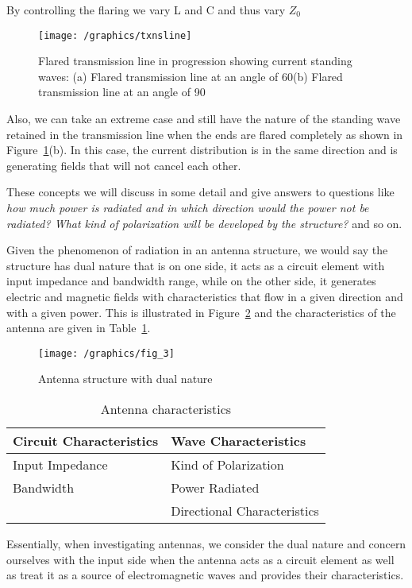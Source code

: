 By controlling the flaring we vary L and C and thus vary $Z_0$
\begin{figure}[h]
\centering
\texttt{[image: /graphics/txnsline]}
\caption{Flared transmission line in progression showing current standing waves: (a) Flared transmission line at an angle of 60\textdegree (b) Flared transmission line at an angle of 90\textdegree}
\label{fig:flaredtxnsline}
\end{figure}

Also, we can take an extreme case and still have the nature of the standing wave retained in the transmission line when the ends are flared completely as shown in Figure~\ref{fig:flaredtxnsline}(b). In this case, the current distribution is in the same direction and is generating fields that will not cancel each other.

These concepts we will discuss in some detail and give answers to questions like \emph{how much power is radiated and in which direction would the power not be radiated? What kind of polarization will be developed by the structure?} and so on.

Given the phenomenon of radiation in an antenna structure, we would say the structure has dual nature that is on one side, it acts as a circuit element with input impedance and bandwidth range, while on the other side, it generates electric and magnetic fields with characteristics that flow in a given direction and with a given power. This is illustrated in Figure~\ref{fig:antennadualnature} and the characteristics of the antenna are given in Table~\ref{tab:antennachar}.
\begin{figure}[h]
\centering
\texttt{[image: /graphics/fig\_3]}
\caption{Antenna structure with dual nature}
\label{fig:antennadualnature}
\end{figure}
\begin{table}[h]
\centering
\caption{Antenna characteristics}
\begin{tabular}{|l|l|}
\hline
\textbf{Circuit Characteristics} & \textbf{Wave Characteristics} \\
\hline
Input Impedance & Kind of Polarization \\
\hline
Bandwidth & Power Radiated \\
\hline
  & Directional Characteristics \\
\hline
\end{tabular}
\label{tab:antennachar}
\end{table}

Essentially, when investigating antennas, we consider the dual nature and concern ourselves with the input side when the antenna acts as a circuit element as well as treat it as a source of electromagnetic waves and provides their characteristics. 

